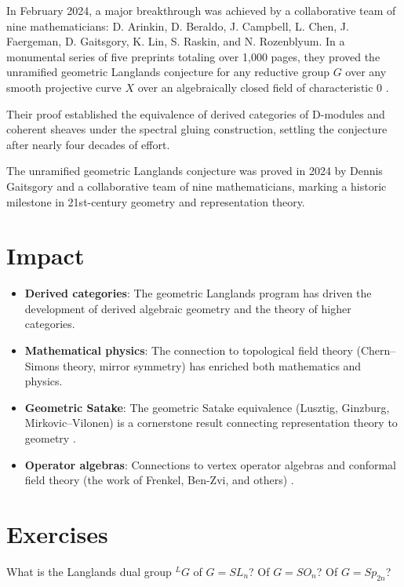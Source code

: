 In February 2024, a major breakthrough was achieved by a collaborative team of nine mathematicians: D. Arinkin, D. Beraldo, J. Campbell, L. Chen, J. Faergeman, D. Gaitsgory, K. Lin, S. Raskin, and N. Rozenblyum. In a monumental series of five preprints totaling over 1,000 pages, they proved the unramified geometric Langlands conjecture for any reductive group $G$ over any smooth projective curve $X$ over an algebraically closed field of characteristic 0 \cite{arinkin2024}.

Their proof established the equivalence of derived categories of D-modules and coherent sheaves under the spectral gluing construction, settling the conjecture after nearly four decades of effort.

\begin{highlightbox}
The unramified geometric Langlands conjecture was proved in 2024 by Dennis Gaitsgory and a collaborative team of nine mathematicians, marking a historic milestone in 21st-century geometry and representation theory.
\end{highlightbox}

\section{Impact}

\begin{itemize}
\item \textbf{Derived categories}: The geometric Langlands program has driven the development of derived algebraic geometry and the theory of higher categories.
\item \textbf{Mathematical physics}: The connection to topological field theory (Chern--Simons theory, mirror symmetry) has enriched both mathematics and physics.
\item \textbf{Geometric Satake}: The geometric Satake equivalence (Lusztig, Ginzburg, Mirkovic--Vilonen) is a cornerstone result connecting representation theory to geometry \cite{mirkovic2007}.
\item \textbf{Operator algebras}: Connections to vertex operator algebras and conformal field theory (the work of Frenkel, Ben-Zvi, and others) \cite{frenkel2007}.
\end{itemize}

\section{Exercises}

\begin{exercise}[Basic]
What is the Langlands dual group $^LG$ of $G = SL_n$? Of $G = SO_n$? Of $G = Sp_{2n}$?
\end{exercise}

